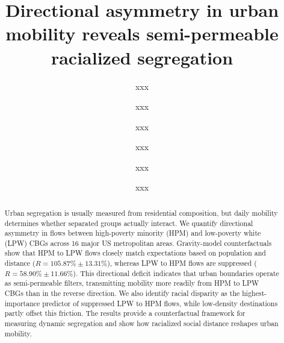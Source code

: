 \documentclass[9pt,twocolumn,twoside]{pnas-new}
\begin{document}
\title{Directional asymmetry in urban mobility reveals semi-permeable racialized segregation}

\author[a]{xxx}
\author[b]{xxx}
\author[c]{xxx}
\author[d]{xxx}
\author[e]{xxx}
\author[f]{xxx}








\begin{abstract}
Urban segregation is usually measured from residential composition, but daily mobility determines whether separated groups actually interact. We quantify directional asymmetry in flows between high-poverty minority (HPM) and low-poverty white (LPW) CBGs across 16 major US metropolitan areas. Gravity-model counterfactuals show that HPM to LPW flows closely match expectations based on population and distance ($R = 105.87\% \pm 13.31\%$), whereas LPW to HPM flows are suppressed ($R = 58.90\% \pm 11.66\%$). This directional deficit indicates that urban boundaries operate as semi-permeable filters, transmitting mobility more readily from HPM to LPW CBGs than in the reverse direction. We also identify racial disparity as the highest-importance predictor of suppressed LPW to HPM flows, while low-density destinations partly offset this friction. The results provide a counterfactual framework for measuring dynamic segregation and show how racialized social distance reshapes urban mobility.
\end{abstract}
\end{document}
